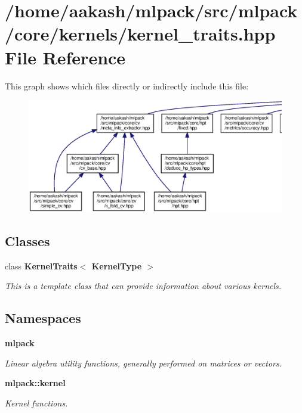 \section{/home/aakash/mlpack/src/mlpack/core/kernels/kernel\+\_\+traits.hpp File Reference}
\label{kernel__traits_8hpp}
This graph shows which files directly or indirectly include this file\+:
\nopagebreak
\begin{figure}[H]
\begin{center}
\leavevmode
\includegraphics[width=350pt]{kernel__traits_8hpp__dep__incl}
\end{center}
\end{figure}
\subsection*{Classes}
\begin{DoxyCompactItemize}
\item 
class \textbf{ Kernel\+Traits$<$ Kernel\+Type $>$}
\begin{DoxyCompactList}\small\item\em This is a template class that can provide information about various kernels. \end{DoxyCompactList}\end{DoxyCompactItemize}
\subsection*{Namespaces}
\begin{DoxyCompactItemize}
\item 
 \textbf{ mlpack}
\begin{DoxyCompactList}\small\item\em Linear algebra utility functions, generally performed on matrices or vectors. \end{DoxyCompactList}\item 
 \textbf{ mlpack\+::kernel}
\begin{DoxyCompactList}\small\item\em Kernel functions. \end{DoxyCompactList}\end{DoxyCompactItemize}


